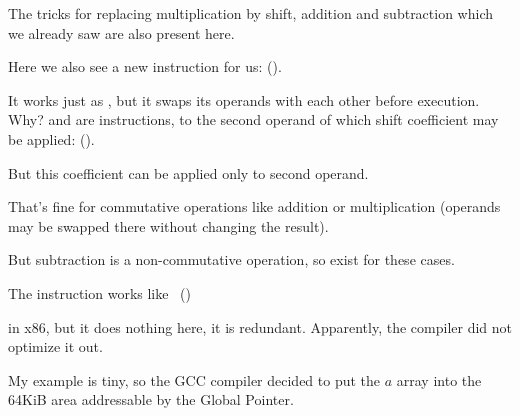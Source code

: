 The tricks for replacing multiplication by shift, addition and subtraction which we already saw
are also present here.

Here we also see a new instruction for us: \RSB ().

It works just as \SUB, but it swaps its operands with each other before execution.
Why?
\SUB and \RSB  are instructions, to the second operand of which shift coefficient may be applied: (). 

But this coefficient can be applied only to second operand.

That's fine for commutative operations like addition or multiplication 
(operands may be swapped there without changing the result).

But subtraction is a non-commutative operation, so \RSB exist for these cases.

The  instruction works like \LEA~()

in x86, but it does nothing here, it is redundant.
Apparently, the compiler did not optimize it out.


My example is tiny, so the GCC compiler decided to put the $a$ array into the 64KiB area 
addressable by the Global Pointer.



